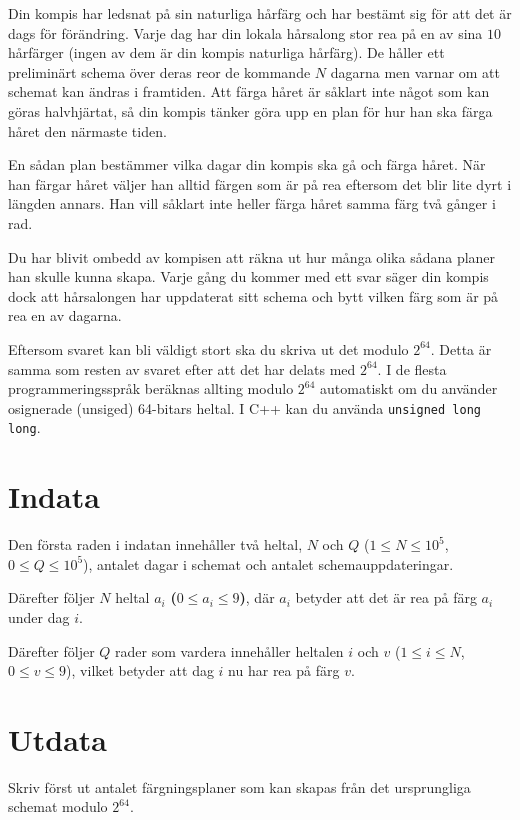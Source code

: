 \noindent

Din kompis har ledsnat på sin naturliga hårfärg och har bestämt sig för att det är dags för förändring.
Varje dag har din lokala hårsalong stor rea på en av sina $10$ hårfärger (ingen av dem
är din kompis naturliga hårfärg). De håller ett preliminärt schema över deras reor de kommande $N$
dagarna men varnar om att schemat kan ändras i framtiden. Att färga håret är såklart inte något som kan
göras halvhjärtat, så din kompis tänker göra upp en plan för hur han ska färga håret den närmaste tiden.

En sådan plan bestämmer vilka dagar din kompis ska gå och färga håret. När han färgar håret väljer han
alltid färgen som är på rea eftersom det blir lite dyrt i längden annars. Han vill såklart inte heller
färga håret samma färg två gånger i rad.

Du har blivit ombedd av kompisen att räkna ut hur många olika sådana planer han skulle kunna skapa.
Varje gång du kommer med ett svar säger din kompis dock att hårsalongen har uppdaterat sitt schema
och bytt vilken färg som är på rea en av dagarna.

Eftersom svaret kan bli väldigt stort ska du skriva ut det modulo $2^{64}$. Detta är samma som
resten av svaret efter att det har delats med $2^{64}$. I de flesta programmeringsspråk
beräknas allting modulo $2^{64}$ automatiskt om du använder osignerade (unsiged) 64-bitars heltal.
I C++ kan du använda \texttt{unsigned long long}.

\section*{Indata}
Den första raden i indatan innehåller två heltal, $N$ och $Q$ ($1 \leq N \leq 10^5$, $0 \leq Q \leq 10^5$),
antalet dagar i schemat och antalet schemauppdateringar.

Därefter följer $N$ heltal $a_i$ \textbf{($0 \leq a_i \leq 9$)}, där $a_i$ betyder att det är rea på färg $a_i$ under dag $i$.

Därefter följer $Q$ rader som vardera innehåller heltalen $i$ och $v$ ($1 \leq i \leq N$, \textbf{$0 \leq v \leq 9$}),
vilket betyder att dag $i$ nu har rea på färg $v$.

\section*{Utdata}
Skriv först ut antalet färgningsplaner som kan skapas från det ursprungliga schemat modulo $2^{64}$.


